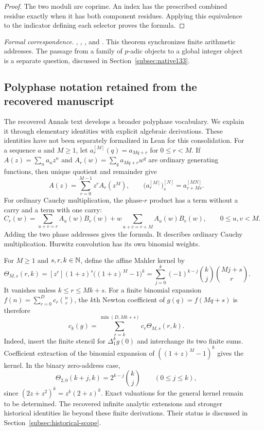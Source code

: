 \begin{proof}
The two moduli are coprime. An index has the prescribed combined residue
exactly when it has both component residues. Applying this equivalence to
the indicator defining each selector proves the formula.
\end{proof}

\begingroup\small\raggedright
\noindent\emph{Formal correspondence.}
, ,
, and
.
This theorem synchronizes finite arithmetic addresses. The passage from a
family of $p$-adic objects to a global integer object is a separate question,
discussed in Section~\ref{subsec:native133}.
\par\endgroup

\subsection{Polyphase notation retained from the recovered manuscript}
\label{subsec:polyphase-exposition}

The recovered Annals text develops a broader polyphase vocabulary. We explain
it through elementary identities with explicit algebraic derivations. These
identities have not been separately formalized in Lean for this consolidation.
For a sequence $a$ and $M\geq1$, let $a_r^{[M]}(q)=a_{Mq+r}$ for $0\leq r<M$.
If $A(z)=\sum_n a_nz^n$ and $A_r(w)=\sum_q a_{Mq+r}w^q$ are ordinary generating
functions, then unique quotient and remainder give
\[
A(z)=\sum_{r=0}^{M-1}z^rA_r(z^M),\qquad
\bigl(a_r^{[M]}\bigr)_s^{[N]}=a_{r+Ms}^{[MN]}.
\]
For ordinary Cauchy multiplication, the phase-$r$ product has a term without a
carry and a term with one carry:
\[
C_r(w)=\sum_{u+v=r}A_u(w)B_v(w)
+w\sum_{u+v=r+M}A_u(w)B_v(w),\qquad 0\leq u,v<M.
\]
Adding the two phase addresses gives the formula. It describes ordinary
Cauchy multiplication. Hurwitz convolution has its own binomial weights.

For $M\geq1$ and $s,r,k\in\mathbb N$, define the affine Mahler kernel by
\[
\Theta_{M,s}(r,k)=[z^r](1+z)^s\bigl((1+z)^M-1\bigr)^k
=\sum_{j=0}^{k}(-1)^{k-j}\binom kj\binom{Mj+s}{r}.
\]
It vanishes unless $k\leq r\leq Mk+s$. For a finite binomial expansion
$f(n)=\sum_{r=0}^{D}c_r\binom nr$, the $k$th Newton coefficient of
$g(q)=f(Mq+s)$ is therefore
\[
c_k(g)=\sum_{r=k}^{\min(D,Mk+s)}c_r\Theta_{M,s}(r,k).
\]
Indeed, insert the finite stencil for $\Delta_1^k g(0)$ and interchange its
two finite sums. Coefficient extraction of the binomial expansion of
$((1+z)^M-1)^k$ gives the kernel. In the binary zero-address case,
\[
\Theta_{2,0}(k+j,k)=2^{k-j}\binom kj\qquad(0\leq j\leq k),
\]
since $(2z+z^2)^k=z^k(2+z)^k$.
Exact valuations for the general kernel remain to be determined. The
recovered infinite analytic extensions and stronger historical identities
lie beyond these finite derivations. Their status is discussed in
Section~\ref{subsec:historical-scope}.
